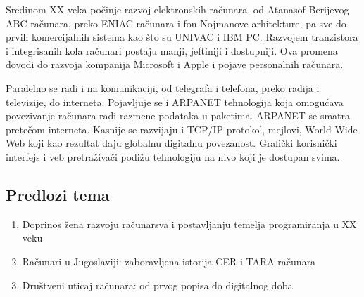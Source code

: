 \documentclass[12pt]{article}
\begin{document}
Sredinom XX veka počinje razvoj elektronskih računara, od Atanasof-Berijevog ABC računara, preko ENIAC računara i fon Nojmanove arhitekture, pa sve do prvih komercijalnih sistema kao što su UNIVAC i IBM PC. Razvojem tranzistora i integrisanih kola računari postaju manji, jeftiniji i dostupniji. Ova promena dovodi do razvoja kompanija Microsoft i Apple i  pojave personalnih računara.

Paralelno se radi i na komunikaciji, od telegrafa i telefona, preko radija i televizije, do interneta. Pojavljuje se i ARPANET tehnologija koja omogućava povezivanje računara radi razmene podataka u paketima. ARPANET se smatra pretečom interneta. Kasnije se razvijaju i TCP/IP protokol, mejlovi, World Wide Web koji kao rezultat daju globalnu digitalnu povezanost. Grafički korisnički interfejs i veb pretraživači podižu tehnologiju na nivo koji je dostupan svima.


\subsection{Predlozi tema}
\begin{enumerate}
    \item Doprinos žena razvoju računarsva i postavljanju temelja programiranja u XX veku
    \item Računari u Jugoslaviji: zaboravljena istorija CER i TARA računara
    \item Društveni uticaj računara: od prvog popisa do digitalnog doba
\end{enumerate}
\end{document}
